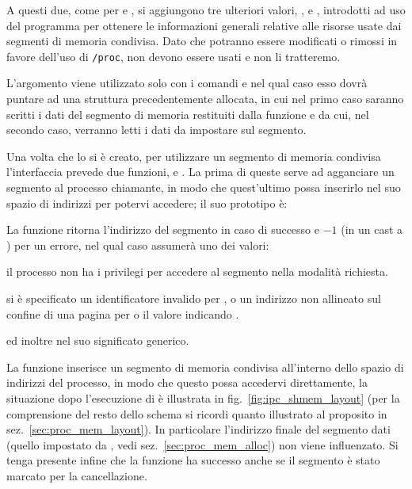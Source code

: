A questi due, come per  e , si aggiungono tre
ulteriori valori, ,  e ,
introdotti ad uso del programma  per ottenere le informazioni
generali relative alle risorse usate dai segmenti di memoria condivisa. Dato
che potranno essere modificati o rimossi in favore dell'uso di \texttt{/proc},
non devono essere usati e non li tratteremo.

L'argomento  viene utilizzato solo con i comandi 
e  nel qual caso esso dovrà puntare ad una struttura
 precedentemente allocata, in cui nel primo caso saranno
scritti i dati del segmento di memoria restituiti dalla funzione e da cui, nel
secondo caso, verranno letti i dati da impostare sul segmento.

Una volta che lo si è creato, per utilizzare un segmento di memoria condivisa
l'interfaccia prevede due funzioni,  e . La prima di
queste serve ad agganciare un segmento al processo chiamante, in modo che
quest'ultimo possa inserirlo nel suo spazio di indirizzi per potervi accedere;
il suo prototipo è:

\begin{funcproto}{

}

{La funzione ritorna l'indirizzo del segmento in caso di successo e $-1$ (in
  un cast a ) per un errore, nel qual caso  assumerà
  uno dei valori:
  \begin{errlist}
    \item[\errcode{EACCES}] il processo non ha i privilegi per accedere al
      segmento nella modalità richiesta.
    \item[\errcode{EINVAL}] si è specificato un identificatore invalido per
      , o un indirizzo non allineato sul confine di una pagina
      per  o il valore  indicando .
  \end{errlist}
  ed inoltre  nel suo significato generico.
}  
\end{funcproto}

La funzione inserisce un segmento di memoria condivisa all'interno dello
spazio di indirizzi del processo, in modo che questo possa accedervi
direttamente, la situazione dopo l'esecuzione di  è illustrata in
fig.~\ref{fig:ipc_shmem_layout} (per la comprensione del resto dello schema si
ricordi quanto illustrato al proposito in sez.~\ref{sec:proc_mem_layout}). In
particolare l'indirizzo finale del segmento dati (quello impostato da
, vedi sez.~\ref{sec:proc_mem_alloc}) non viene influenzato.
Si tenga presente infine che la funzione ha successo anche se il segmento è
stato marcato per la cancellazione.

